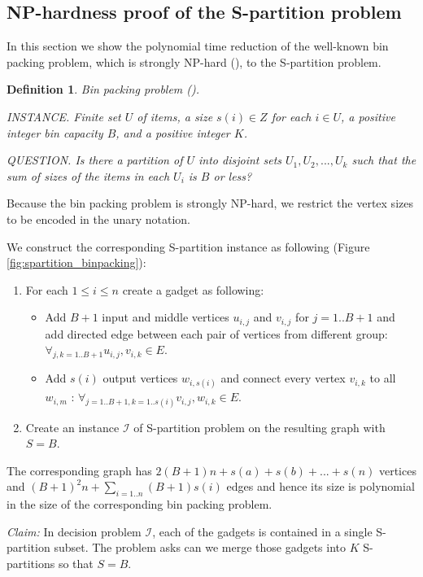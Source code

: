 \documentclass[sigconf]{acmart}
\newtheorem{mydef}{Definition}
\begin{document}
\subsection{NP-hardness proof of the S-partition problem}
\label{sec:np-hard}
In this section we show the polynomial time reduction of the well-known bin 
packing problem, which is strongly NP-hard
(\cite{computersIntractability}), to the S-partition problem.

\begin{mydef}
	Bin packing problem (\cite{computersIntractability}). 
	
	INSTANCE. Finite set $U$ of items, a size $s(i) \in Z$ for each $i \in U$, 
	a positive integer bin capacity $B$, and a positive integer $K$.
	
	QUESTION. Is there a partition of $U$ into disjoint sets $U_1, U_2, ..., 
	U_k$ such that the sum of sizes of the items in each $U_i$ is $B$ or less?
\end{mydef}

Because the bin packing problem is strongly NP-hard, we restrict the vertex 
sizes to be encoded in the unary notation.

We construct the corresponding S-partition instance as following (Figure 
\ref{fig:spartition_binpacking}):
\begin{enumerate}
	\item For each $1 \le i \le n$ create a gadget as following:
	\begin{itemize}
		\item Add $B+1$ input and middle vertices $u_{i, j}$ and $v_{i, j}$ for 
		$j = 1..B+1$ 
		and add directed edge between each pair of vertices from different 
		group: $\forall_{j,k = 
		1..B+1}u_{i,j},v_{i,k} \in E$.
		\item Add $s(i)$ output vertices $w_{i, s(i)}$ and connect every vertex 
		$v_{i,k}$ to all $w_{i,m}$ : $\forall_{j = 
			1..B+1, k = 1..s(i)}v_{i,j},w_{i,k} \in E$.
	\end{itemize}
	\item Create an instance $\mathcal{I}$ of S-partition problem on the 
	resulting graph 
	with $S = B$.
\end{enumerate}

The corresponding graph has $2(B+1)n + s(a)+s(b)+...+s(n)$ vertices and 
$(B+1)^2 n + \sum_{i = 1..n}(B+1)s(i)$ edges and hence its size is polynomial 
in the size 
of the corresponding bin packing problem.

\textit{Claim:}
In decision problem $\mathcal{I}$, each of the gadgets is contained in a single 
S-partition subset. 
The problem asks can we merge those gadgets into $K$ S-partitions so that $S = 
B$.
\end{document}
